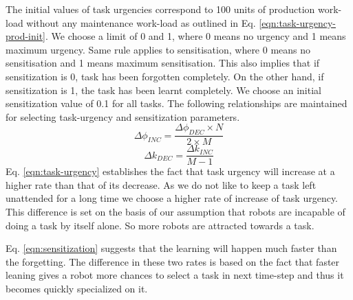 \documentclass[smallcondensed]{svjour3}
\begin{document}
The initial values of task urgencies correspond to 100 units of production work-load without any maintenance work-load as outlined in Eq. \ref{eqn:task-urgency-prod-init}. We choose a limit of 0 and 1, where 0 means no urgency and 1 means maximum urgency. Same rule applies to sensitisation, where 0 means no sensitisation and 1 means maximum sensitisation. This also implies that if sensitization is 0, task has been forgotten completely. On the other hand, if sensitization is 1, the task has been learnt completely. We choose an initial sensitization value of 0.1 for all tasks. The following relationships are maintained for selecting task-urgency and sensitization parameters.
\begin{equation}
\Delta\phi_{INC} = \frac{\Delta\phi_{DEC} \times N}{2 \times M}
\label{eqn:task-urgency}
\end{equation}
%
\begin{equation}
\Delta k_{DEC} = \frac{\Delta k_{INC}} {M - 1} 
\label{eqn:sensitization}
\end{equation}
%
Eq. \ref{eqn:task-urgency} establishes the fact that task urgency will increase at a higher rate than that of its decrease. As we do not like to keep a task left unattended for a long time we choose a higher rate of increase of task urgency. This difference is set on the basis of our assumption that robots are incapable of doing a task by itself alone. So more robots are attracted towards a task.

Eq. \ref{eqn:sensitization} suggests that the learning will happen much faster than the forgetting. The difference in these two rates is based on the fact that faster leaning gives a robot more chances to select a task in next time-step and thus it becomes quickly specialized on it.
\end{document}
